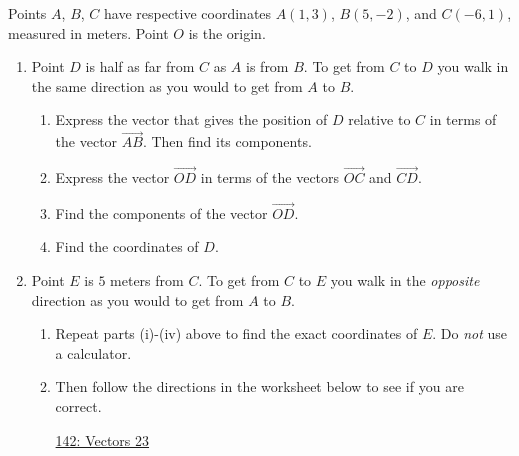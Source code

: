 \documentclass{ximera}
\begin{document}
\begin{question} \label{Q944tfghhnvbfc}
Points $A$, $B$, $C$ have respective coordinates $A(1,3)$, $B(5,-2)$, and $C(-6,1)$, measured in meters. Point $O$ is the origin.
\begin{enumerate}
\item Point $D$ is half as far from $C$ as $A$ is from $B$. To get from $C$ to $D$ you walk in the same direction as you would to get from $A$ to $B$.

\begin{enumerate}

\item Express the vector that gives the position of $D$ relative to $C$ in terms of the vector $\overrightarrow{AB}$. Then find its components.

\item Express the vector $\overrightarrow{OD}$ in terms of the vectors $\overrightarrow{OC}$ and $\overrightarrow{CD}$.

\item Find the components of the vector $\overrightarrow{OD}$.

\item Find the coordinates of $D$.
\end{enumerate}

\item Point $E$ is $5$ meters from $C$. To get from $C$ to $E$ you walk in the \emph{opposite} direction as you would to get from $A$ to $B$. 

\begin{enumerate}
\item Repeat parts (i)-(iv) above to find the exact coordinates of $E$. Do \emph{not} use a calculator.

\item Then follow the directions in the worksheet below to see if you are correct.

\begin{onlineOnly}
    \begin{center}
\end{center}
\end{onlineOnly}

\href{https://www.desmos.com/calculator/bk4xda8g08}{142: Vectors 23}

\end{enumerate}
\end{enumerate}

\end{question}
\end{document}
